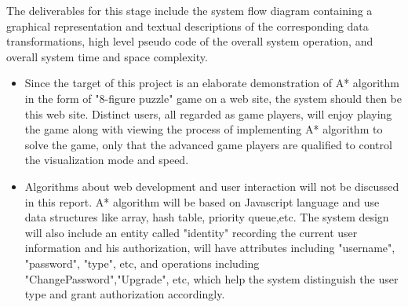 \textnormal{
The deliverables for this stage include the system flow diagram containing a graphical representation and textual descriptions of the corresponding data transformations, high level pseudo code of the overall system operation, and overall system time and space complexity.}

\begin{itemize}
\item{ }
Since the target of this project is an elaborate demonstration of A* algorithm in the form of "8-figure puzzle" game on a web site, the system should then be this web site. Distinct users, all regarded as game players, will enjoy playing the game along with viewing the process of implementing A* algorithm to solve the game, only that the advanced game players are qualified to control the visualization mode and speed.
\item{ }
Algorithms about web development and user interaction will not be discussed in this report. A* algorithm will be based on Javascript language and use data structures like array, hash table, priority queue,etc. The system design will also include an entity called "identity" recording the current user information and his authorization, will have attributes including "username", "password", "type", etc, and operations including "ChangePassword","Upgrade", etc, which help the system distinguish the user type and grant authorization accordingly.
\end{itemize}

